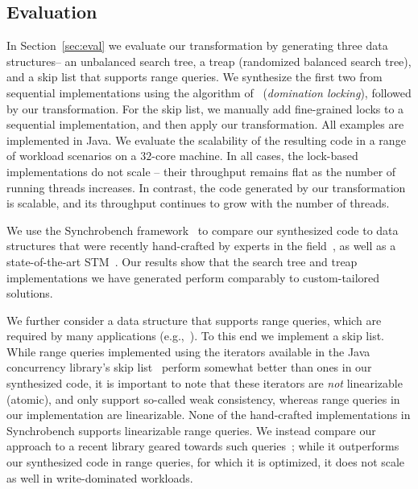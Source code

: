 \subsection{Evaluation}
In Section~\ref{sec:eval} we evaluate our transformation by generating three data structures-- an unbalanced search tree, a treap
(randomized balanced search tree),
and a skip list that supports range queries. We synthesize the first two from sequential implementations using the algorithm of~\cite{Gueta2011} (\emph{domination locking}), followed by our transformation.
For the skip list, we manually add fine-grained locks to a sequential implementation, and then apply our transformation.
All examples are implemented in Java. We evaluate the scalability of the resulting code
in a range of workload scenarios on a $32$-core machine.
In all cases, the lock-based implementations do not scale --
their throughput remains flat as the number of running threads increases. In contrast, the code generated by our transformation
is scalable, and its throughput continues to grow with the number of threads.

We use the Synchrobench framework~\cite{Gramoli2015} to 
compare our synthesized code to data structures that were recently hand-crafted by experts in the field~\cite{DrachslerVY2014,BronsonCCO2010,ConcurrentSkipList,EllenFRB2010,CrainGR2013}, 
as well as a state-of-the-art STM~\cite{DiceSS2006}.
Our results show that the search tree and treap implementations we have generated
perform comparably to custom-tailored solutions.

We further consider a data structure that supports range queries, which are required by
many applications (e.g.,~\cite{levelDB,FerroJKRY14}). To this end we implement a skip list.
While range queries implemented using the iterators available in the Java concurrency library's skip list~\cite{ConcurrentSkipList} perform
somewhat better than ones in our synthesized code, it is important to note that these iterators are \emph{not}
linearizable (atomic), and only support so-called weak consistency, whereas range queries in our implementation are linearizable.
None of the hand-crafted implementations in Synchrobench supports linearizable range queries. We instead compare our 
approach to a recent library geared towards such queries~\cite{BrownA12}; while it outperforms our synthesized code in range queries, for which it is optimized, it does not scale as well in 
write-dominated workloads. 
%

